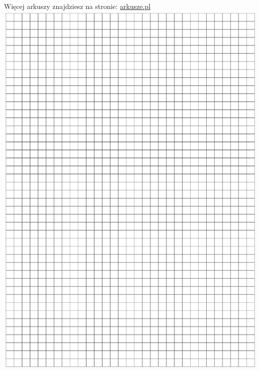 \documentclass[10pt]{article}
\begin{document}
Więcej arkuszy znajdziesz na stronie: \href{http://arkusze.pl}{arkusze.pl}\\
\includegraphics[max width=\textwidth, center]{2024_11_21_5229b9d0453456f1828dg-08}\\
\end{document}

